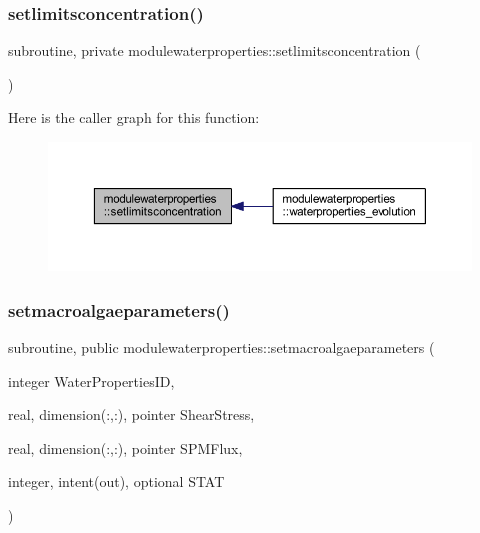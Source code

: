 \subsubsection{\texorpdfstring{setlimitsconcentration()}{setlimitsconcentration()}}
{\footnotesize\ttfamily subroutine, private modulewaterproperties\+::setlimitsconcentration (\begin{DoxyParamCaption}{ }\end{DoxyParamCaption})\hspace{0.3cm}{\ttfamily [private]}}

Here is the caller graph for this function\+:\nopagebreak
\begin{figure}[H]
\begin{center}
\leavevmode
\includegraphics[width=350pt]{namespacemodulewaterproperties_abf8fd0a88a0f3e9bf66064666c864915_icgraph}
\end{center}
\end{figure}
\mbox{\label{namespacemodulewaterproperties_a04f02aae382274eb3a7fb04e8be06e48}} 
\subsubsection{\texorpdfstring{setmacroalgaeparameters()}{setmacroalgaeparameters()}}
{\footnotesize\ttfamily subroutine, public modulewaterproperties\+::setmacroalgaeparameters (\begin{DoxyParamCaption}\item[{integer}]{Water\+Properties\+ID,  }\item[{real, dimension(\+:,\+:), pointer}]{Shear\+Stress,  }\item[{real, dimension(\+:,\+:), pointer}]{S\+P\+M\+Flux,  }\item[{integer, intent(out), optional}]{S\+T\+AT }\end{DoxyParamCaption})}

